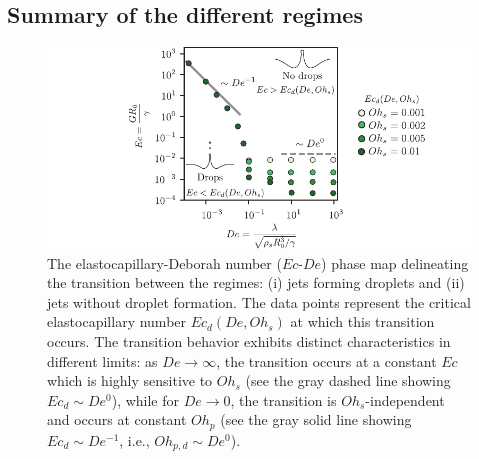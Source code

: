 \documentclass{jfm}
\begin{document}
\subsection{Summary of the different regimes}
\label{subsec:summaryRegimes}

\begin{figure}
	\centering
	\includegraphics[width=\textwidth]{Figures/Transition/Transtion_07_onlyDrops-eps-converted-to.pdf}
	\caption{The elastocapillary-Deborah number ($Ec$-$De$) phase map delineating the transition between the regimes: (i) jets forming droplets and (ii) jets without droplet formation. The data points represent the critical elastocapillary number $Ec_d(De, Oh_s)$ at which this transition occurs. The transition behavior exhibits distinct characteristics in different limits: as $De \to \infty$, the transition occurs at a constant $Ec$ which is highly sensitive to $Oh_s$ (see the gray dashed line showing $Ec_d \sim De^0$), while for $De \to 0$, the transition is $Oh_s$-independent and occurs at constant $Oh_p$ (see the gray solid line showing $Ec_d \sim De^{-1}$, i.e., $Oh_{p,d} \sim De^0$).}
	\label{fig:transitionDrops}
\end{figure}
\end{document}
